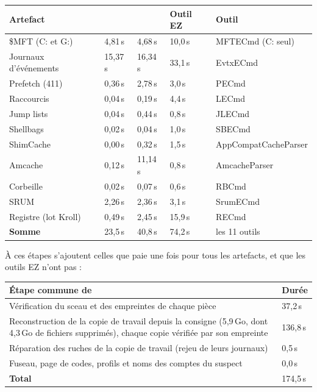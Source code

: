 \documentclass[11pt,a4paper,oneside]{report}
\begin{document}
\begin{longtable}{@{}L{4.0cm}L{2.1cm}L{2.5cm}L{2.1cm}L{3.8cm}@{}}
\toprule
\textbf{Artefact} & \textbf{\wac{}} & \textbf{\wac{} } & \textbf{Outil EZ} & \textbf{Outil} \\
\midrule\endhead
\$MFT (C: et G:) & 4,81\,s & 4,68\,s & 10,0\,s & MFTECmd (C: seul) \\
Journaux d'événements & 15,37\,s & 16,34\,s & 33,1\,s & EvtxECmd \\
Prefetch (411) & 0,36\,s & 2,78\,s & 3,0\,s & PECmd \\
Raccourcis & 0,04\,s & 0,19\,s & 4,4\,s & LECmd \\
Jump lists & 0,04\,s & 0,44\,s & 0,8\,s & JLECmd \\
Shellbags & 0,02\,s & 0,04\,s & 1,0\,s & SBECmd \\
ShimCache & 0,00\,s & 0,32\,s & 1,5\,s & AppCompat\-Cache\-Parser \\
Amcache & 0,12\,s & 11,14\,s & 0,8\,s & AmcacheParser \\
Corbeille & 0,02\,s & 0,07\,s & 0,6\,s & RBCmd \\
SRUM & 2,26\,s & 2,36\,s & 3,1\,s & SrumECmd \\
Registre (lot Kroll) & 0,49\,s & 2,45\,s & 15,9\,s & RECmd \\
\midrule
\textbf{Somme} & 23,5\,s & 40,8\,s & 74,2\,s & les 11 outils \\
\bottomrule
\end{longtable}

À ces étapes s'ajoutent celles que \wac{} paie une fois pour tous les artefacts,
et que les outils EZ n'ont pas :

\begin{longtable}{@{}L{11.0cm}L{4.0cm}@{}}
\toprule
\textbf{Étape commune de \wac{}} & \textbf{Durée} \\
\midrule\endhead
Vérification du sceau et des empreintes de chaque pièce & 37,2\,s \\
Reconstruction de la copie de travail depuis la consigne (5,9\,Go, dont
  4,3\,Go de fichiers supprimés), chaque copie vérifiée par son empreinte & 136,8\,s \\
Réparation des ruches de la copie de travail (rejeu de leurs journaux) & 0,5\,s \\
Fuseau, page de codes, profils et noms des comptes du suspect & 0,0\,s \\
\midrule
\textbf{Total} & 174,5\,s \\
\bottomrule
\end{longtable}
\end{document}
